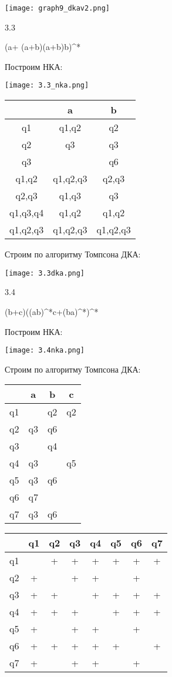 \documentclass{article}
\begin{document}
\texttt{[image: graph9\_dkav2.png]}

3.3

(a+ (a+b)(a+b)b)^*

Построим НКА:

\texttt{[image: 3.3\_nka.png]}

\begin{tabular}{ | c | c | c | }
\hline
 & a & b  \\ \hline
q1 & q1,q2 & q2 \\ \hline
q2 & q3 & q3  \\ \hline
q3 &  & q6 \\ \hline
q1,q2 & q1,q2,q3 & q2,q3 \\ \hline
q2,q3 & q1,q3 & q3 \\ \hline
q1,q3,q4 & q1,q2 & q1,q2  \\ \hline
q1,q2,q3 & q1,q2,q3 & q1,q2,q3 \\ \hline
\end{tabular}

Строим по алгоритму Томпсона ДКА:

\texttt{[image: 3.3dka.png]}

3.4

(b+c)((ab)^*c+(ba)^*)^*

Построим НКА:

\texttt{[image: 3.4nka.png]}

Строим по алгоритму Томпсона ДКА:

\begin{tabular}{ | c | c | c | c | }
\hline
 & a & b & c  \\ \hline
q1 &  & q2 & q2 \\ \hline
q2 & q3 & q6 & \\ \hline
q3 &  & q4 & \\ \hline
q4 & q3 &  & q5\\ \hline
q5 & q3 & q6 & \\ \hline
q6 & q7 &  & \\ \hline
q7 & q3 & q6 & \\ \hline
\end{tabular}


\begin{tabular}{ | c | c | c | c | c | c | c | c | }
\hline
 & q1 & q2 & q3 & q4 & q5 & q6 & q7 \\ \hline
q1 &  & + & + & + & + & + & + \\ \hline
q2 & + &  & + & + &  & + &  \\ \hline
q3 & + & + &  & + & + & + & + \\ \hline
q4 & + & + & + &  & + & + & + \\ \hline
q5 & + &  & + & + &  & + &  \\ \hline
q6 & + & + & + & + & + &  & + \\ \hline
q7 & + &  & + & + &  & + &  \\ \hline
\end{tabular}
\end{document}
